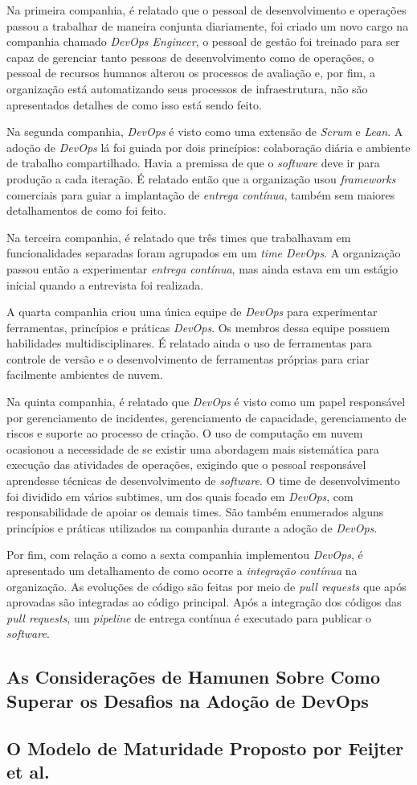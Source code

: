 Na primeira companhia, é relatado que o pessoal de desenvolvimento e
operações passou a trabalhar de maneira conjunta diariamente, foi criado um
novo cargo na companhia chamado \textit{DevOps Engineer}, o pessoal de gestão
foi treinado para ser capaz de gerenciar tanto pessoas de desenvolvimento como
de operações, o pessoal de recursos humanos alterou os processos de avaliação e,
por fim, a organização está automatizando seus processos de infraestrutura, não
são apresentados detalhes de como isso está sendo feito.

Na segunda companhia, \textit{DevOps} é visto como uma extensão de
\textit{Scrum} e \textit{Lean}. A adoção de \textit{DevOps} lá foi guiada por
dois princípios: colaboração diária e ambiente de trabalho compartilhado.
Havia a premissa de que o \textit{software} deve ir para produção a cada
iteração. É relatado então que a organização usou \textit{frameworks}
comerciais para guiar a implantação de \emph{entrega contínua}, também sem maiores
detalhamentos de como foi feito.

Na terceira companhia, é relatado que três times que trabalhavam em
funcionalidades separadas foram agrupados em um \emph{time DevOps}. A organização
passou então a experimentar \textit{entrega contínua}, mas ainda estava em
um estágio inicial quando a entrevista foi realizada.

A quarta companhia criou uma única equipe de \textit{DevOps} para
experimentar ferramentas, princípios e práticas \textit{DevOps}. Os
membros dessa equipe possuem habilidades multidisciplinares. É relatado ainda
o uso de ferramentas para controle de versão e o desenvolvimento de ferramentas
próprias para criar facilmente ambientes de nuvem.

Na quinta companhia, é relatado que \textit{DevOps} é visto como
um papel responsável por gerenciamento de incidentes, gerenciamento de
capacidade, gerenciamento de riscos e suporte ao processo de criação.
O uso de computação em nuvem ocasionou a necessidade de se existir uma
abordagem mais sistemática para execução das atividades de operações, exigindo
que o pessoal responsável aprendesse técnicas de desenvolvimento de
\textit{software}. O time de desenvolvimento foi dividido em vários subtimes,
um dos quais focado em \textit{DevOps}, com responsabilidade de apoiar os demais
times. São também enumerados alguns princípios e práticas utilizados na companhia
durante a adoção de \textit{DevOps}.

Por fim, com relação a como a sexta companhia implementou \textit{DevOps},
é apresentado um detalhamento de como ocorre a \emph{integração contínua} na
organização. As evoluções de código são feitas por meio de \textit{pull
requests} que após aprovadas são integradas ao código principal. Após a
integração dos códigos das \textit{pull requests}, um \textit{pipeline} de entrega
contínua é executado para publicar o \textit{software}.

\subsection{As Considerações de Hamunen \cite{challenges_in_adopting_devops} Sobre Como Superar os Desafios na Adoção de DevOps}\label{como_superar_desafios}

\subsection{O Modelo de Maturidade Proposto por Feijter et al. \cite{feijter2017towards}}\label{modelo_maturidade}
